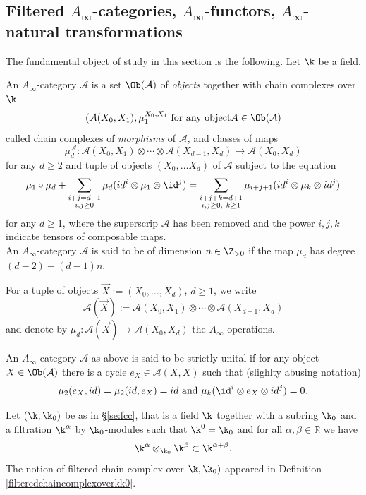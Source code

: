 

\subsection{Filtered $A_\infty$-categories, $A_\infty$-functors, $A_\infty$-natural transformations}\label{a:sb:fil-ai}
The fundamental object of study in this section is the following. Let $\k$ be a field.
\begin{dfn}
  An $A_\infty$-category $\mathcal{A}$ is a set $\Ob(\mathcal{A})$ of \textit{objects} together with chain complexes over $\k$ $$(\mathcal{A}(X_0,X_1),\mu_1^{X_0,X_1} \text{  for any object} A\in \Ob(\mathcal{A})$$ called chain complexes of \textit{morphisms} of $\mathcal{A}$, and classes of maps $$\mu_d^{\mathcal{A}}\colon \mathcal{A}(X_0,X_1)\otimes \cdots \otimes \mathcal{A}(X_{d-1},X_d)\to \mathcal{A}(X_0,X_d)$$ for any $d\geq 2$ and tuple of objects $(X_0,\ldots X_d)$ of $\mathcal{A}$ subject to the equation \begin{equation}\label{ainfequation}
    \mu_1\circ\mu_d + \sum_{\substack{i+j=d-1\\i,j\geq 0}}\mu_d(id^i\otimes \mu_1\otimes \id^j) = \sum_{\substack{i+j+k=d+1\\i,j\geq 0, \ k \geq 1}}\mu_{i+j+1}(id^i\otimes \mu_k\otimes id^j)
\end{equation}  for any $d\geq 1$, where the superscrip $\mathcal{A}$ has been removed and the power $i,j,k$ indicate tensors of composable maps.\\
An $A_\infty$-category $\mathcal{A}$ is said to be of dimension $n\in \Z_{>0}$ if the map $\mu_d$ has degree $(d-2)+(d-1)n$.
\end{dfn}
For a tuple of objects
$\vec{X} := (X_0, \ldots, X_d)$, $d \geq 1$, we write
$$\mathcal{A}(\vec{X}) := \mathcal{A}(X_0, X_1) \otimes \cdots
\otimes \mathcal{A}(X_{d-1}, X_d)$$ and denote by
$\mu_d: \mathcal{A}(\vec{X}) \longrightarrow \mathcal{A}(X_0, X_d)$
the $A_{\infty}$-operations.
\begin{dfn}
  An $A_\infty$-category $\mathcal{A}$ as above is said to be strictly unital if for any object $X\in \Ob(\mathcal{A})$ there is a cycle $e_X\in \mathcal{A}(X,X)$ such that (slighlty abusing notation) $$\mu_2(e_X,id)=\mu_2(id,e_X)= id \text{   and  }\mu_k(\id^i\otimes e_X\otimes id^j)=0.$$
\end{dfn}
Let $(\k,\k_0)$ be as in \S\ref{se:fcc}, that is a field $\k$ together with a subring $\k_0$ and a filtration $\k^\alpha$ by $\k_0$-modules such that $\k^0=\k_0$ and for all $\alpha,\beta\in \mathbb{R}$ we have $$\k^\alpha\otimes_{\k_0} \k^\beta \subset \k^{\alpha+\beta}.$$ The notion of filtered chain complex over $\k,\k_0)$ appeared in Definition \ref{filteredchaincomplexoverkk0}.

